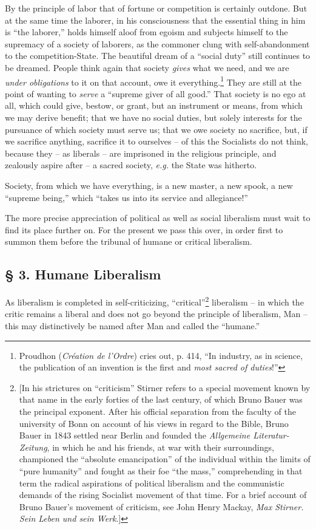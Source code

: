 \documentclass[12pt,a4paper]{book}
\begin{document}
By the principle of labor that of fortune or competition is certainly outdone. 
But at the same time the laborer, in his consciousness that the essential 
thing in him is ``the laborer,'' holds himself aloof from egoism and 
subjects himself to the supremacy of a society of laborers, as the commoner 
clung with self-abandonment to the competition-State. The beautiful dream of a 
``social duty'' still continues to be dreamed. People think again that 
society \textit{gives} what we need, and we are \textit{under obligations} to 
it on that account, owe it everything.\footnote{Proudhon (\textit{Cr\'eation 
de l'Ordre}) cries out, p. 414, ``In industry, as in science, the publication 
of an invention is the first and \textit{most sacred of duties}!''} They are 
still at the point of wanting to \textit{serve} a ``supreme giver of all 
good.'' That society is no ego at all, which could give, bestow, or grant, 
but an instrument or means, from which we may derive benefit; that we have no 
social duties, but solely interests for the pursuance of which society must 
serve us; that we owe society no sacrifice, but, if we sacrifice anything, 
sacrifice it to ourselves -- of this the Socialists do not think, because they 
-- as liberals -- are imprisoned in the religious principle, and zealously 
aspire after -- a sacred society, \textit{e.g.} the State was hitherto.

Society, from which we have everything, is a new master, a new spook, a new 
``supreme being,'' which ``takes us into its service and allegiance!''

The more precise appreciation of political as well as social liberalism must 
wait to find its place further on. For the present we pass this over, in order 
first to summon them before the tribunal of humane or critical liberalism.

\subsection[\S{} 3. Humane Liberalism]{\centering \S{} 3. Humane Liberalism}

As liberalism is completed in self-criticizing, ``critical''\footnote{[In 
his strictures on ``criticism'' Stirner refers to a special movement known 
by that name in the early forties of the last century, of which Bruno Bauer 
was the principal exponent. After his official separation from the faculty of 
the university of Bonn on account of his views in regard to the Bible, Bruno 
Bauer in 1843 settled near Berlin and founded the \textit{Allgemeine 
Literatur-Zeitung}, in which he and his friends, at war with their 
surroundings, championed the ``absolute emancipation'' of the individual 
within the limits of ``pure humanity'' and fought as their foe ``the 
mass,'' comprehending in that term the radical aspirations of political 
liberalism and the communistic demands of the rising Socialist movement of 
that time. For a brief account of Bruno Bauer's movement of criticism, see 
John Henry Mackay, \textit{Max Stirner. Sein Leben und sein Werk}.]} 
liberalism -- in which the critic remains a liberal and does not go beyond the 
principle of liberalism, Man -- this may distinctively be named after Man and 
called the ``humane.''
\end{document}

